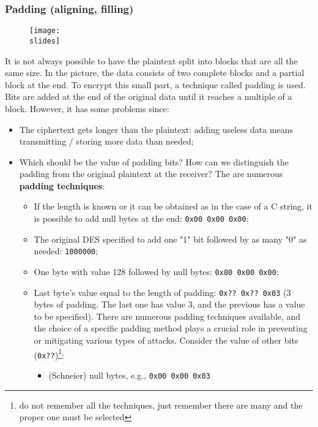 \subsubsection{Padding (aligning, filling)}
\begin{figure}[H]
    \centering
    \texttt{[image: \\slides]}
\end{figure}
It is not always possible to have the plaintext split into blocks that are all the same size. In the picture, the data consists of two complete blocks and a partial block at the end. To encrypt this small part, a technique called padding is used. Bits are added at the end of the original data until it reaches a multiple of a block.
However, it has some problems since:
\begin{itemize}
    \item The ciphertext gets longer than the plaintext: adding useless data means transmitting / storing more data
          than needed;
    \item Which should be the value of padding bits? How can we distinguish the padding from the original
          plaintext at the receiver?
          The are numerous \textbf{padding techniques}:
          \begin{itemize}
              \item If the length is known or it can be obtained as in the case of a C string, it is possible to add null bytes
                    at the end: \texttt{0x00 0x00 0x00};
              \item The original DES specified to add one "1" bit followed by as many "0" as needed: \texttt{1000000};
              \item One byte with value 128 followed by null bytes: \texttt{0x80 0x00 0x00};
              \item Last byte's value equal to the length of padding: \texttt{0x?? 0x?? 0x03} (3 bytes of padding. The last one
                    has value 3, and the previous has a value to be specified).
                    There are numerous padding techniques available, and the choice of a specific padding method plays a crucial role in preventing or mitigating various types of attacks.
                    Consider the value of other bits (\texttt{0x??})\footnote{do not remember all the techniques, just remember there
                        are many and the proper one must be selected}:
                    \begin{itemize}
                        \item (Schneier) null bytes, e.g., \texttt{0x00 0x00 0x03}

\end{itemize}
\end{itemize}
\end{itemize}
